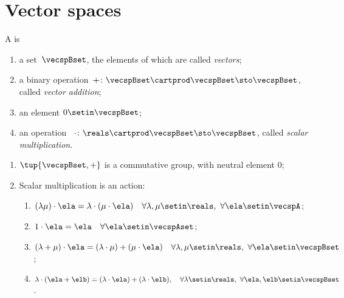 
\section{Vector spaces}
\label{sec:vector-spaces}



\begin{ctdefinition}
    \label{def:real-vector-space}
    A  is
    \begin{body}
        \constit
        \begin{enumerate}
            \item a set~$\vecspBset$, the elements of which are called \emph{vectors};
            \item a binary operation~$+ \colon \vecspBset \cartprod \vecspBset \sto \vecspBset$, called \emph{vector addition};
            \item an element $0 \setin \vecspBset$;
            \item an operation ~$\cdot \colon \reals \cartprod \vecspBset \sto \vecspBset$, called \emph{scalar multiplication}.
        \end{enumerate}
        \condit
        \begin{enumerate}
            \item $\tup{\vecspBset, +}$ is a commutative group, with neutral element $0$;
            \item Scalar multiplication is an action:
                  \begin{enumerate}
                      \item $(\lambda \mu) \cdot \ela = \lambda \cdot( \mu \cdot \ela) \quad \forall \lambda, \mu \setin \reals, \ \forall \ela \setin \vecspA$;
                      \item $1 \cdot \ela = \ela \quad \forall \ela \setin \vecspAset$;
                      \item $(\lambda + \mu) \cdot \ela = (\lambda \cdot \mu) + (\mu \cdot \ela) \quad \forall \lambda, \mu \setin \reals, \ \forall \ela \setin \vecspBset$;
                      \item $\lambda \cdot (\ela + \elb) = (\lambda \cdot \ela) + (\lambda \cdot \elb), \quad \forall \lambda \setin \reals, \ \forall \ela, \elb \setin \vecspBset$.
                  \end{enumerate}
        \end{enumerate}
    \end{body}
\end{ctdefinition}

